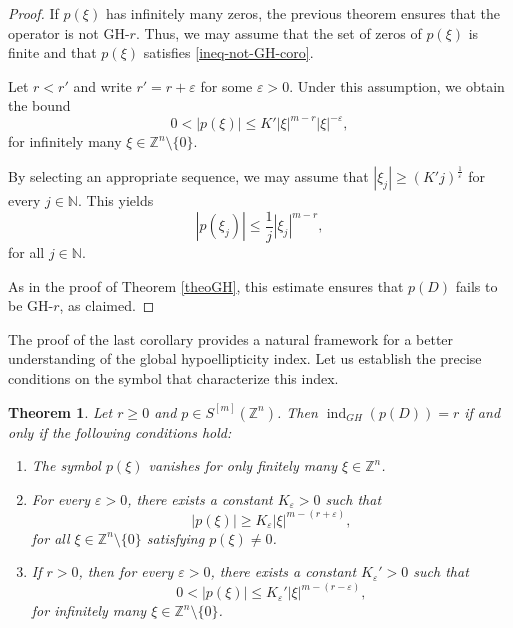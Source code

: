 \documentclass[11pt]{amsart}
\numberwithin{equation}{section}
\newtheorem{theorem}{Theorem}[section]
\theoremstyle{definition}
\begin{document}
	\begin{proof}
		If \( p(\xi) \) has infinitely many zeros, the previous theorem ensures that the operator is not GH-\( r \). Thus, we may assume that the set of zeros of \( p(\xi) \) is finite and that \( p(\xi) \) satisfies \eqref{ineq-not-GH-coro}. 
		
		Let \( r < r' \) and write \( r' = r + \varepsilon \) for some \( \varepsilon > 0 \). Under this assumption, we obtain the bound  
		\begin{equation*}
			0 < |p(\xi)| \leq K' |\xi|^{m - r} |\xi|^{-\varepsilon},
		\end{equation*}
		for infinitely many \( \xi \in \mathbb{Z}^n \setminus \{0\} \).
				
		By selecting an appropriate sequence, we may assume that \( |\xi_j| \geq (K' j)^{\frac{1}{\varepsilon}} \) for every \( j \in \mathbb{N} \). This yields  
		\begin{equation*}
			|p(\xi_j)| \leq \frac{1}{j} |\xi_j|^{m - r},
		\end{equation*}
		for all \( j \in \mathbb{N} \). 
		
		As in the proof of Theorem \ref{theoGH}, this estimate ensures that \( p(D) \) fails to be GH-\( r \), as claimed.
	\end{proof}
	
	The proof of the last corollary provides a natural framework for a better understanding of the global hypoellipticity index. Let us establish the precise conditions on the symbol that characterize this index.
	
	\begin{theorem}\label{theoGHindex}
		Let \( r \geq 0 \) and \( p \in S^{[m]}(\mathbb{Z}^n) \). Then  \( \operatorname{ind}_{GH}(p(D)) = r \) if and only if the following conditions hold:
		\begin{enumerate}
			\item[{\it (i)}] The symbol \( p(\xi) \) vanishes for only finitely many \( \xi \in \mathbb{Z}^n \).
			
			\item[{\it (ii)}] For every \( \varepsilon > 0 \), there exists a constant \( K_\varepsilon > 0 \) such that
			\begin{equation}\label{ineqGH}
				|p(\xi)| \geq K_\varepsilon |\xi|^{m - (r + \varepsilon)},
			\end{equation}
			for all \( \xi \in \mathbb{Z}^n \setminus \{0\} \) satisfying \( p(\xi) \neq 0 \).
			
			\item[{\it (iii)}] If \( r > 0 \), then for every \( \varepsilon > 0 \), there exists a constant \( K_{\varepsilon}' > 0 \) such that
			\begin{equation}\label{ineqGH_2}
				0 < |p(\xi)| \leq K_{\varepsilon}' |\xi|^{m - (r - \varepsilon)},
			\end{equation}
			for infinitely many \( \xi \in \mathbb{Z}^n \setminus \{0\} \).
		\end{enumerate}
	\end{theorem}
	
\end{document}
